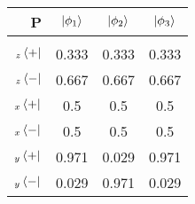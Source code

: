 \documentclass[12pt]{article}
\begin{document}
\begin{center}
\begin{tabular}{r | c c c}
P & $\Ket{\phi_1}$ & $\Ket{\phi_2}$ & $\Ket{\phi_3}$ \\
\hline \\
$_z\Bra{+}$ & 
    

    
    0.333
 &
    
    0.333
 &
    
    0.333

 \\
$_z\Bra{-}$ & 
    

    
    0.667
 &
    
    0.667
 &
    
    0.667

 \\
$_x\Bra{+}$ & 
    

    
    0.5
 &
    
    0.5
 &
    
    0.5

 \\
$_x\Bra{-}$ & 
    

    
    0.5
 &
    
    0.5
 &
    
    0.5

 \\
$_y\Bra{+}$ & 
    

    
    0.971
 &
    
    0.029
 &
    
    0.971

 \\
$_y\Bra{-}$ & 
    

    
    0.029
 &
    
    0.971
 &
    
    0.029


\end{tabular}
\end{center}
\end{document}
